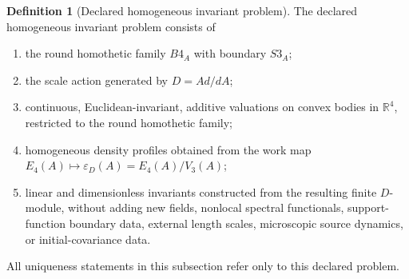 \documentclass[11pt,a4paper]{article}
\def\Bfour{B4}%
\def\Sthree{S3}%
\def\dd{d}%
\def\Dil{D}%
\numberwithin{equation}{section}
\theoremstyle{definition}
\newtheorem{definition}[criterion]{Definition}
\theoremstyle{plain}
\theoremstyle{remark}
\newcommand{\Sthree}{S^3}
\newcommand{\Bfour}{B^4}
\newcommand{\Dil}{\mathscr{D}}
\newcommand{\Efour}{E_4}
\newcommand{\epsD}{\varepsilon_D}
\newcommand{\dd}{\mathrm{d}}
\begin{document}
\begin{definition}[Declared homogeneous invariant problem]
The declared homogeneous invariant problem consists of
\begin{enumerate}
\item the round homothetic family \(\Bfour_A\) with boundary \(\Sthree_A\);
\item the scale action generated by \(\Dil=A\dd/\dd A\);
\item continuous, Euclidean-invariant, additive valuations on convex bodies in
\(\mathbb R^4\), restricted to the round homothetic family;
\item homogeneous density profiles obtained from the work map
\(\Efour(A)\mapsto\epsD(A)=\Efour(A)/V_3(A)\);
\item linear and dimensionless invariants constructed from the resulting finite
\(\Dil\)-module, without adding new fields, nonlocal spectral functionals,
support-function boundary data, external length scales, microscopic source
dynamics, or initial-covariance data.
\end{enumerate}
All uniqueness statements in this subsection refer only to this declared
problem.
\end{definition}
\end{document}
